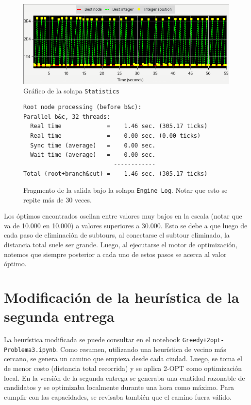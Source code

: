 \documentclass[titlepage,a4paper,oneside]{article}
\begin{document}
\begin{figure}[H]
\centering
\includegraphics[width=\textwidth]{images/subtours.png}
\caption{Gráfico de la solapa \texttt{Statistics}}
\end{figure}

\begin{figure}[H]
\begin{verbatim}
Root node processing (before b&c):
Parallel b&c, 32 threads:
  Real time             =    1.46 sec. (305.17 ticks)
  Real time             =    0.00 sec. (0.00 ticks)
  Sync time (average)   =    0.00 sec.
  Wait time (average)   =    0.00 sec.
                          ------------
Total (root+branch&cut) =    1.46 sec. (305.17 ticks)
\end{verbatim}
\caption{Fragmento de la salida bajo la solapa \texttt{Engine Log}. Notar que esto se repite más de 30 veces.}
\end{figure}

Los óptimos encontrados oscilan entre valores muy bajos en la escala (notar que va de 10.000 en 10.000) a valores superiores a 30.000. Esto se debe a que luego de cada paso de eliminación de subtours, al conectarse el subtour eliminado, la distancia total suele ser grande. Luego, al ejecutarse el motor de optimización, notemos que siempre posterior a cada uno de estos pasos se acerca al valor óptimo.

\section{Modificación de la heurística de la segunda entrega}
La heurística modificada se puede consultar en el notebook \texttt{Greedy+2opt-Problema3.ipynb}. Como resumen, utilizando una heurística de vecino más cercano, se genera un camino que empieza desde cada ciudad. Luego, se toma el de menor costo (distancia total recorrida) y se aplica 2-OPT como optimización local. En la versión de la segunda entrega se generaba una cantidad razonable de candidatos y se optimizaba localmente durante una hora como máximo. Para cumplir con las capacidades, se revisaba también que el camino fuera válido.
\end{document}
